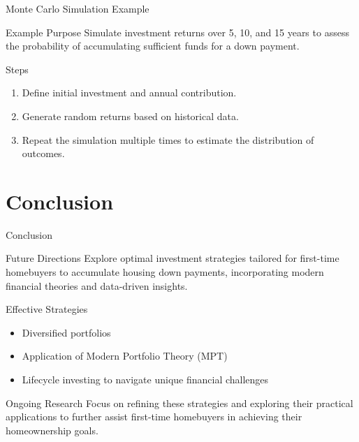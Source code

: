 \documentclass{beamer}
\begin{document}
\begin{frame}{Monte Carlo Simulation Example}
    \begin{block}{Example Purpose}
        Simulate investment returns over 5, 10, and 15 years to assess the probability of accumulating sufficient funds for a down payment.
    \end{block}
    \begin{block}{Steps}
        \begin{enumerate}
            \item Define initial investment and annual contribution.
            \item Generate random returns based on historical data.
            \item Repeat the simulation multiple times to estimate the distribution of outcomes.
        \end{enumerate}
    \end{block}
\end{frame}



\section{Conclusion}
\begin{frame}{Conclusion}
    \begin{block}{Future Directions}
        Explore optimal investment strategies tailored for first-time homebuyers to accumulate housing down payments, incorporating modern financial theories and data-driven insights.
    \end{block}
    \begin{block}{Effective Strategies}
        \begin{itemize}
            \item Diversified portfolios
            \item Application of Modern Portfolio Theory (MPT)
            \item Lifecycle investing to navigate unique financial challenges
        \end{itemize}
    \end{block}
    \begin{block}{Ongoing Research}
        Focus on refining these strategies and exploring their practical applications to further assist first-time homebuyers in achieving their homeownership goals.
    \end{block}
\end{frame}
\end{document}
